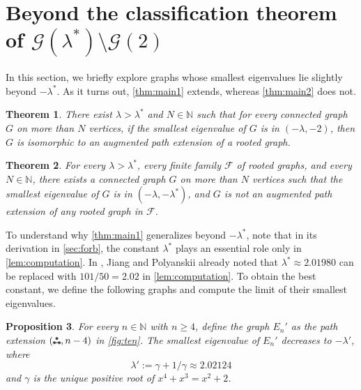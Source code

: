 \documentclass[11pt]{article}
\newtheorem{theorem}{Theorem}[section]
\newtheorem{proposition}[theorem]{Proposition}
\theoremstyle{definition}
\theoremstyle{remark}
\newcommand{\ga}{\gamma}
\newcommand{\la}{\lambda}
\newcommand{\las}{\lambda^*}
\newcommand{\F}{\mathcal{F}}
\newcommand{\G}{\mathcal{G}}
\newcommand{\N}{\mathbb{N}}
\newcommand{\ftwo}{\tikz[baseline=-0.2ex, scale=0.9]{\draw[darkgray, thick] (0,0)--(0.2,0); \draw[darkgray, fill=darkgray] (0,0) circle (0.05); \draw[darkgray, fill=darkgray] (0.1,0.17320508075) circle (0.05); \draw[darkgray, fill=darkgray] (0.2,0) circle (0.05);}}
\begin{document}
\section{Beyond the classification theorem of \texorpdfstring{$\G(\las)\setminus \G(2)$}{G(λ*)\G(2)}} \label{sec:beyond}

In this section, we briefly explore graphs whose smallest eigenvalues lie slightly beyond $-\las$. As it turns out, \cref{thm:main1} extends, whereas \cref{thm:main2} does not.

\begin{theorem} \label{thm:beyond-las-yes}
    There exist $\la > \las$ and $N \in \N$ such that for every connected graph $G$ on more than $N$ vertices, if the smallest eigenvalue of $G$ is in $(-\la, -2)$, then $G$ is isomorphic to an augmented path extension of a rooted graph.
\end{theorem}

\begin{theorem} \label{thm:beyond-las-no}
    For every $\la > \las$, every finite family $\F$ of rooted graphs, and every $N \in \N$, there exists a connected graph $G$ on more than $N$ vertices such that the smallest eigenvalue of $G$ is in $(-\la, -\las)$, and $G$ is not an augmented path extension of any rooted graph in $\F$.
\end{theorem}

To understand why \cref{thm:main1} generalizes beyond $-\las$, note that in its derivation in \cref{sec:forb}, the constant $\las$ plays an essential role only in \cref{lem:computation}. In \cite[Appendix~A]{JP25}, Jiang and Polyanskii already noted that $\las \approx 2.01980$ can be replaced with $101/50 = 2.02$ in \cref{lem:computation}. To obtain the best constant, we define the following graphs and compute the limit of their smallest eigenvalues.

\begin{proposition} \label{lem:lambda-prime}
    For every $n \in \N$ with $n \ge 4$, define the graph $E_n'$ as the path extension $(\ftwo, n-4)$ in \cref{fig:ten}. The smallest eigenvalue of $E_n'$ decreases to $-\la'$, where \[\la' := \ga + 1/\ga \approx 2.02124\] and $\ga$ is the unique positive root of $x^4 + x^3 = x^2 + 2$.
\end{proposition}
\end{document}

